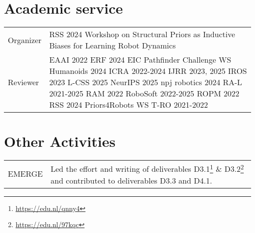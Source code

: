 \section*{Academic service}
\noindent
\begin{longtable}{p{} p{}}
    Organizer & RSS 2024 Workshop on Structural Priors as Inductive Biases for Learning Robot Dynamics\\
    Reviewer & 
        EAAI 2022 \newline
        ERF 2024 EIC Pathfinder Challenge WS \newline
        Humanoids 2024 \newline
        ICRA 2022-2024 \newline 
        IJRR 2023, 2025 \newline
        IROS 2023 \newline
        L-CSS 2025 \newline
        NeurIPS 2025 \newline
        npj robotics 2024 \newline
        RA-L 2021-2025 \newline
        RAM 2022 \newline
        RoboSoft 2022-2025 \newline
        ROPM 2022 \newline
        RSS 2024 Priors4Robots WS \newline
        T-RO 2021-2022
    \\
\end{longtable}

\section*{Other Activities}
\noindent
\begin{longtable}{p{} p{}}
    EMERGE & Led the effort and writing of deliverables D3.1\footnote{\url{https://edu.nl/qnny4}} \& D3.2\footnote{\url{https://edu.nl/97kqc}} and contributed to deliverables D3.3 and D4.1.\\
\end{longtable}